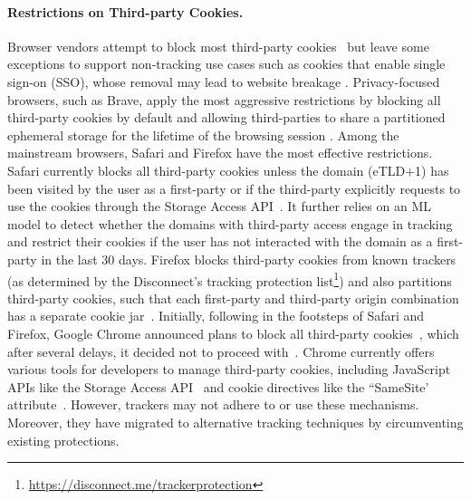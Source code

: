 
\paragraph{Restrictions on Third-party Cookies.}
%
Browser vendors attempt to block most third-party cookies~\cite{mdnThirdpartyCookiesPrivacy2024} but leave some exceptions to support non-tracking use cases such as cookies that enable single sign-on (SSO), whose removal may lead to website breakage \cite{crouchImprovingPrivacyBreaking2018}. 
%
Privacy-focused browsers, such as Brave, apply the most aggressive restrictions by blocking all third-party cookies by default and allowing third-parties to share a partitioned ephemeral storage for the lifetime of the browsing session \cite{braveprivacyteamEphemeralThirdpartySite2021}. 
%
Among the mainstream browsers, Safari and Firefox have the most effective restrictions. 
%
Safari currently blocks all third-party cookies unless the domain (eTLD+1) has been visited by the user as a first-party or if the third-party explicitly requests to use the cookies through the Storage Access API~\cite{TrackingPreventionWebKit2020}. 
%
It further relies on an ML model to detect whether the domains with third-party access engage in tracking and restrict their cookies if the user has not interacted with the domain as a first-party in the last 30 days. 
%
Firefox blocks third-party cookies from known trackers (as determined by the Disconnect's tracking protection list\footnote{\url{https://disconnect.me/trackerprotection}}) and also partitions third-party cookies, such that each first-party and third-party origin combination has a separate cookie jar~\cite{mdnThirdpartyCookiesPrivacy2024}.
%
Initially, following in the footsteps of Safari and Firefox, Google Chrome announced plans to block all third-party cookies~\cite{chromeBuildingMorePrivate2020}, which after several delays, it decided not to proceed with~\cite{chavezNewPathPrivacy2024}. 
%
Chrome currently offers various tools for developers to manage third-party cookies, including JavaScript APIs like the Storage Access API~\cite{mdnStorageAccessAPI2024} and cookie directives like the ``SameSite' attribute~\cite{mdnSetCookieHTTPMDN2024}. 
%
However, trackers may not adhere to or use these mechanisms. 
%
Moreover, they have migrated to alternative tracking techniques by circumventing existing protections.



